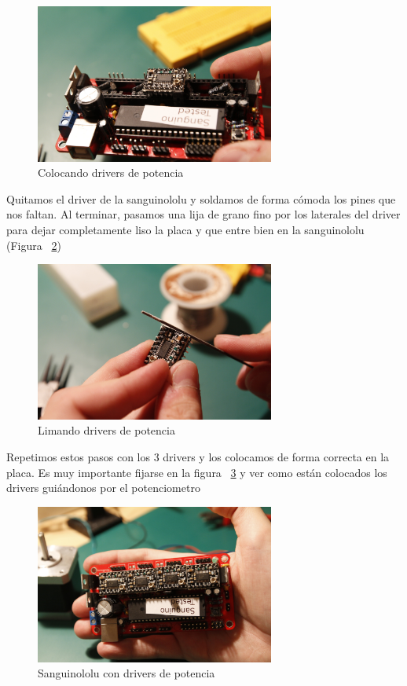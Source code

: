 				\begin{figure}[H]
				\centering
				\includegraphics[width=0.7\textwidth]{../../Fotos/13.jpg}
				\caption{Colocando drivers de potencia}
				\label{fig:zocalo.stepstick}
			\end {figure}
			Quitamos el driver de la sanguinololu y soldamos de forma cómoda los pines que nos faltan. Al terminar, pasamos una lija de grano fino por los laterales del driver para dejar completamente liso la placa y que entre bien en la sanguinololu (Figura ~\ref{fig:limando.stepstick})
				\begin{figure}[H]
				\centering
				\includegraphics[width=0.7\textwidth]{../../Fotos/16.jpg}
				\caption{Limando drivers de potencia}
				\label{fig:limando.stepstick}
			\end {figure}
			Repetimos estos pasos con los 3 drivers y los colocamos de forma correcta en la placa. Es muy importante fijarse en la figura ~\ref{fig:colocando.stepstick} y ver como están colocados los drivers guiándonos por el potenciometro
				\begin{figure}[H]
				\centering
				\includegraphics[width=0.7\textwidth]{../../Fotos/17.jpg}
				\caption{Sanguinololu con drivers de potencia}
				\label{fig:colocando.stepstick}
			\end {figure}

